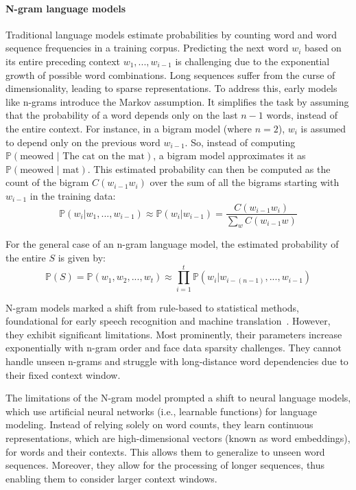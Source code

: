 \paragraph{N-gram language models} Traditional language models estimate probabilities by counting word and word sequence frequencies in a training corpus. Predicting the next word $w_i$ based on its entire preceding context $w_1, ..., w_{i-1}$ is challenging due to the exponential growth of possible word combinations. Long sequences suffer from the curse of dimensionality, leading to sparse representations. To address this, early models like n-grams introduce the Markov assumption. It simplifies the task by assuming that the probability of a word depends only on the last $n-1$ words, instead of the entire context.
 For instance, in a bigram model (where $n=2$), $w_i$ is assumed to depend only on the previous word $w_{i-1}$. So, instead of computing
$\mathbb{P}(\text{meowed | The cat on the mat})$,
a bigram model approximates it as
$\mathbb{P}(\text{meowed | mat})$.
This estimated probability can then be computed as the count of the bigram $C(w_{i-1}w_i)$ over the sum of all the bigrams starting with $w_{i-1}$ in the training data:
\begin{equation}
\mathbb{P}(w_i | w_{1},...,w_{i-1}) \approx \mathbb{P}(w_i | w_{i-1}) = \frac{C(w_{i-1}w_i)}{\sum_{w}C(w_{i-1}w)}
\end{equation}

\noindent For the general case of an n-gram language model, the estimated probability of the entire $S$ is given by: 
\begin{equation}
    \mathbb{P}(S) = \mathbb{P}(w_1, w_2, ..., w_t) \approx \prod_{i=1}^{t} \mathbb{P}(w_i |w_{i-(n-1)}, ..., w_{i-1})
\end{equation}

N-gram models marked a shift from rule-based to statistical methods, foundational for early speech recognition and machine translation~\citep{jelinek1998statistical,brown-etal-1993-mathematics}. However, they exhibit significant limitations. Most prominently, their parameters increase exponentially with n-gram order and face data sparsity challenges. They cannot
handle unseen n-grams and struggle with long-distance word dependencies due to their fixed context window. 

The limitations of the N-gram model prompted a shift to neural language models, which use artificial neural networks (i.e., learnable functions) for language modeling. Instead of relying solely on word counts, they learn continuous representations, which are high-dimensional vectors (known as word embeddings), for words and their contexts. This allows them to generalize to unseen word sequences. Moreover, they allow for the processing of longer sequences, thus enabling them to consider larger context windows. 

